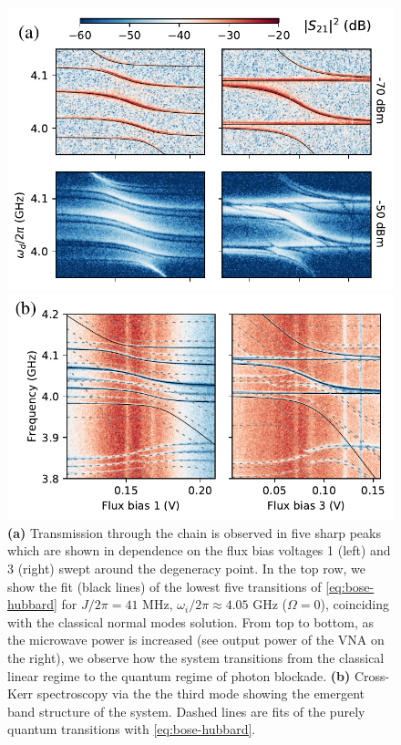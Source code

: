 \documentclass[%
 aps, pra,
 amsmath,amssymb,
 reprint,%
superscriptaddress
]{revtex4-2}
\begin{document}
\begin{figure}[b]
	\centering
	\includegraphics[width=1\linewidth]{Pictures/fig2}
	
	\includegraphics[width=1\linewidth]{Pictures/cktt}
	\caption{\textbf{(a)} Transmission through the chain is observed in five sharp peaks which are shown in dependence on the flux bias voltages 1 (left) and 3 (right) swept around the degeneracy point. In the top row, we show the fit (black lines) of the lowest five transitions of \autoref{eq:bose-hubbard} for $J/2\pi = 41$ MHz, $\omega_i/2\pi \approx 4.05$ GHz ($\Omega = 0$), coinciding with the classical normal modes solution. From top to bottom, as the microwave power is increased (see output power of the VNA on the right), we observe how the system transitions from the classical linear regime to the quantum regime of photon blockade. \textbf{(b)} Cross-Kerr spectroscopy via the the third mode showing the emergent band structure of the system. Dashed lines are fits of the purely quantum transitions with \autoref{eq:bose-hubbard}.}
	\label{fig:transmission}
\end{figure}
\end{document}

